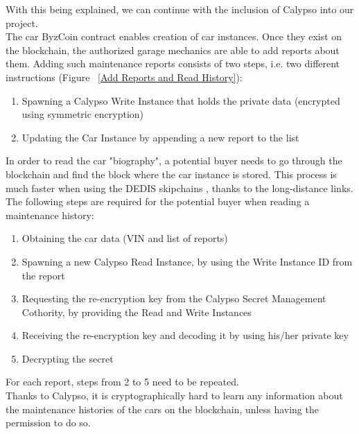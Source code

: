 With this being explained, we can continue with the inclusion of Calypso into our project.\\
\newline
The car ByzCoin contract enables creation of car instances. Once they exist on the blockchain, the authorized garage mechanics are able to add reports about them. 
\newline
Adding such maintenance reports consists of two steps, i.e. two different instructions (Figure ~\ref{Add Reports and Read History}):
\begin{enumerate}
  \item Spawning a Calypso Write Instance that holds the private data (encrypted using symmetric encryption)
  \item Updating the Car Instance by appending a new report to the list
\end{enumerate}
In order to read the car "biography", a potential buyer needs to go through the blockchain and find the block where the car instance is stored. This process is much faster when using the DEDIS skipchains \cite{Chainiac}, thanks to the long-distance links. The following steps are required for the potential buyer when reading a maintenance history:
\begin{enumerate}
  \item Obtaining the car data (VIN and list of reports)
  \item Spawning a new Calypso Read Instance, by using the Write Instance ID from the report
  \item Requesting the re-encryption key from the Calypso Secret Management Cothority, by providing the Read and Write Instances
  \item Receiving the re-encryption key and decoding it by using his/her private key
  \item Decrypting the secret
\end{enumerate}
For each report, steps from 2 to 5 need to be repeated.\\
\newline
Thanks to Calypso, it is cryptographically hard to learn any information about the maintenance histories of the cars on the blockchain, unless having the permission to do so.

